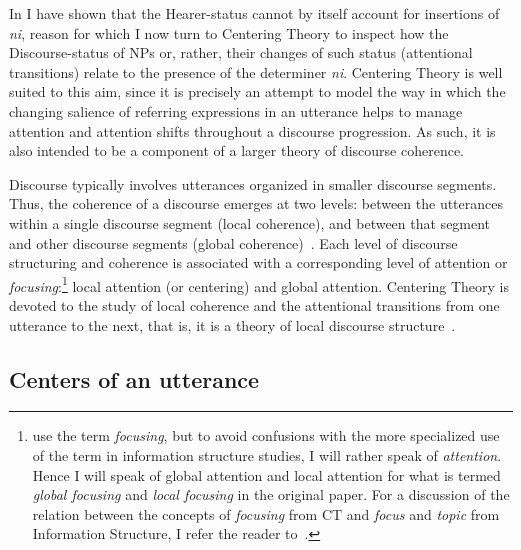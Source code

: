 \documentclass[output=paper
,modfonts
,nonflat]{langsci/langscibook}
\begin{document}
In  I have shown that the Hearer-status cannot by itself account for insertions of \textit{ni}, reason for which I now turn to Centering Theory to inspect how the Discourse-status of NPs or, rather, their changes of such status (attentional transitions) relate to the presence of the determiner \textit{ni}. Centering Theory is well suited to this aim, since it is precisely an attempt to model the way in which the changing salience of referring expressions in an utterance helps to manage attention and attention shifts throughout a discourse progression. As such, it is also intended to be a component of a larger theory of discourse coherence.

Discourse typically involves utterances organized in smaller discourse segments. Thus, the coherence of a discourse emerges at two levels: between the utterances within a single discourse segment (local coherence), and between that segment and other discourse segments (global coherence)~\citep[44]{GroszEtAlii1983}. Each level of discourse structuring and coherence is associated with a corresponding level of attention or \textit{focusing}:\footnote{\citet[44]{GroszEtAlii1983} use the term \textit{focusing}, but to avoid confusions with the more specialized use of the term in information structure studies, I will rather speak of \textit{attention}. Hence I will speak of global attention and local attention for what is termed \textit{global focusing} and \textit{local focusing} in the original paper. For a discussion of the relation between the concepts of \textit{focusing} from CT and \textit{focus} and \textit{topic} from Information Structure, I refer the reader to~\citet[][279, footnote 10]{GundelEtAlii1993}.} local attention (or centering) and global attention.
Centering Theory is devoted to the study of local coherence and the attentional transitions from one utterance to the next, that is, it is a theory of local discourse structure~\citep{GroszEtAlii1995,GroszSidner1998,WalkerEtAlii1998}. 


\subsection{Centers of an utterance}\label{sec:pico:3.2}
\end{document}
